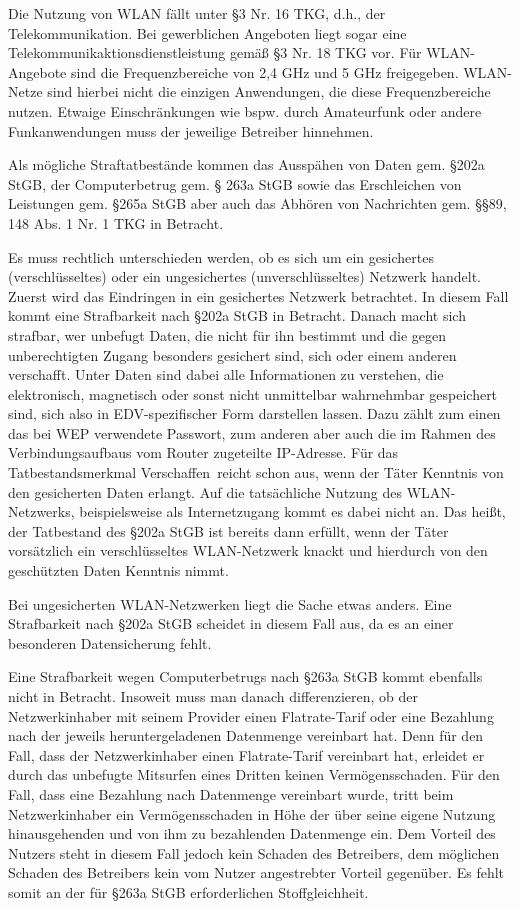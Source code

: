 \documentclass[10pt,a4paper]{article}
\begin{document}
Die Nutzung von WLAN fällt unter §3 Nr. 16 TKG, d.h., der Telekommunikation. Bei gewerblichen Angeboten liegt sogar eine Telekommunikaktionsdienstleistung gemäß §3 Nr. 18 TKG vor. Für WLAN-Angebote sind die Frequenzbereiche von 2,4 GHz und 5 GHz freigegeben. WLAN-Netze sind hierbei nicht die einzigen Anwendungen, die diese Frequenzbereiche nutzen. Etwaige Einschränkungen wie bspw. durch Amateurfunk oder andere Funkanwendungen muss der jeweilige Betreiber hinnehmen.~\cite{Internetrecht}

Als mögliche Straftatbestände kommen das Ausspähen von Daten gem. §202a StGB, der Computerbetrug gem. § 263a StGB sowie das Erschleichen von Leistungen gem. §265a StGB aber auch das Abhören von Nachrichten gem. §§89, 148 Abs. 1 Nr. 1 TKG in Betracht. 

Es muss rechtlich unterschieden werden, ob es sich um ein gesichertes (verschlüsseltes) oder ein ungesichertes (unverschlüsseltes) Netzwerk handelt. Zuerst wird das Eindringen in ein gesichertes Netzwerk betrachtet. In diesem Fall kommt eine Strafbarkeit nach §202a StGB in Betracht. Danach macht sich strafbar, wer unbefugt Daten, die nicht für ihn bestimmt und die gegen unberechtigten Zugang besonders gesichert sind, sich oder einem anderen verschafft. Unter Daten sind dabei alle Informationen zu verstehen, die elektronisch, magnetisch oder sonst nicht unmittelbar wahrnehmbar gespeichert sind, sich also in EDV-spezifischer Form darstellen lassen. Dazu zählt zum einen das bei WEP verwendete Passwort, zum anderen aber auch die im Rahmen des Verbindungsaufbaus vom Router zugeteilte IP-Adresse. Für das Tatbestandsmerkmal \glqq Verschaffen\grqq \ reicht schon aus, wenn der Täter Kenntnis von den gesicherten Daten erlangt. Auf die tatsächliche Nutzung des WLAN-Netzwerks, beispielsweise als Internetzugang kommt es dabei nicht an. Das heißt, der Tatbestand des §202a StGB ist bereits dann erfüllt, wenn der Täter vorsätzlich ein verschlüsseltes WLAN-Netzwerk knackt und hierdurch von den geschützten Daten Kenntnis nimmt.~\cite{InternetStrafrecht, Internetrecht}

Bei ungesicherten WLAN-Netzwerken liegt die Sache etwas anders. Eine Strafbarkeit nach §202a StGB scheidet in diesem Fall aus, da es an einer besonderen Datensicherung fehlt. 

Eine Strafbarkeit wegen Computerbetrugs nach §263a StGB kommt ebenfalls nicht in Betracht. Insoweit muss man danach differenzieren, ob der Netzwerkinhaber mit seinem Provider einen Flatrate-Tarif oder eine Bezahlung nach der jeweils heruntergeladenen Datenmenge vereinbart hat. Denn für den Fall, dass der Netzwerkinhaber einen Flatrate-Tarif vereinbart hat, erleidet er durch das unbefugte Mitsurfen eines Dritten keinen Vermögensschaden. Für den Fall, dass eine Bezahlung nach Datenmenge vereinbart wurde, tritt beim Netzwerkinhaber ein Vermögensschaden in Höhe der über seine eigene Nutzung hinausgehenden und von ihm zu bezahlenden Datenmenge ein. Dem Vorteil des Nutzers steht in diesem Fall jedoch kein Schaden des Betreibers, dem möglichen Schaden des Betreibers kein vom Nutzer angestrebter Vorteil gegenüber. Es fehlt somit an der für §263a StGB erforderlichen Stoffgleichheit.~\cite{Internetrecht}
\end{document}
